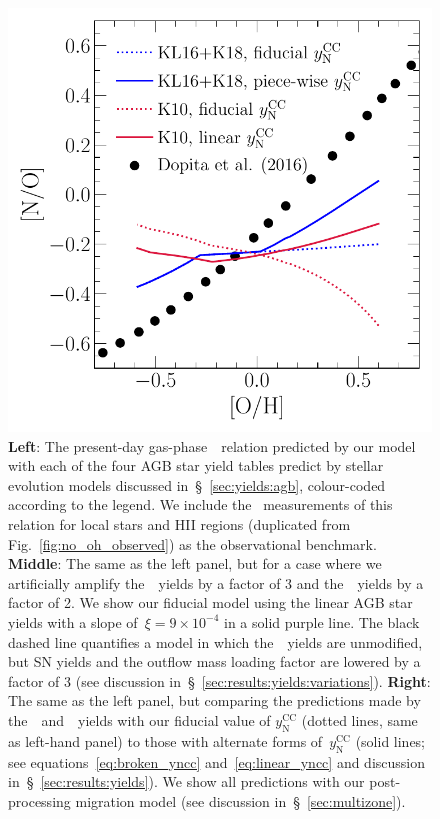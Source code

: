 \documentclass[ms.tex]{subfiles}
\begin{document}
\begin{figure}
\includegraphics[scale = 0.45]{no_oh_predictions_karakas.pdf}
\caption{
\textbf{Left}: The present-day gas-phase~\ohno~relation predicted by our
model with each of the four AGB star yield tables predict by stellar evolution
models discussed in~\S~\ref{sec:yields:agb}, colour-coded according to the
legend.
We include the~\citet{Dopita2016} measurements of this relation for local stars
and HII regions (duplicated from Fig.~\ref{fig:no_oh_observed}) as the
observational benchmark.
\textbf{Middle}: The same as the left panel, but for a case where we
artificially amplify the~\cristallo~yields by a factor of 3 and
the~\ventura~yields by a factor of 2.
We show our fiducial model using the linear AGB star yields with a slope
of~$\xi = 9\times10^{-4}$ in a solid purple line.
The black dashed line quantifies a model in which the~\cristallo~yields are
unmodified, but SN yields and the outflow mass loading factor are lowered by a
factor of 3 (see discussion in~\S~\ref{sec:results:yields:variations}).
\textbf{Right}: The same as the left panel, but comparing the predictions made
by the~\karakasten~and~\karakas~yields with our fiducial value of
$y_\text{N}^\text{CC}$ (dotted lines, same as left-hand panel) to those with
alternate forms of~$y_\text{N}^\text{CC}$ (solid lines; see
equations~\ref{eq:broken_yncc} and~\ref{eq:linear_yncc} and discussion
in~\S~\ref{sec:results:yields}).
We show all predictions with our post-processing migration model (see
discussion in~\S~\ref{sec:multizone}).
}
\label{fig:no_oh_predictions}
\end{figure}
\end{document}
